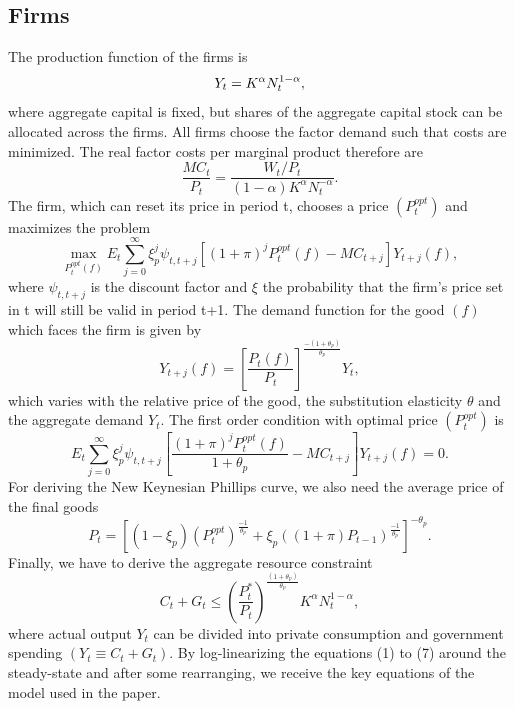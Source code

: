 \documentclass[12pt,a4paper,oneside,titlepage]{article}
\begin{document}
\subsection*{Firms}
The production function of the firms is
\begin{equation}
Y_t = K^\alpha N_t^{1-\alpha},\vspace{-0.3cm} \nonumber
\end{equation}
where aggregate capital is fixed, but shares of the aggregate capital stock can be allocated across the firms. All firms choose the factor demand such that costs are minimized. The real factor costs per marginal product therefore are
\begin{equation}
\frac{MC_t}{P_t} = \frac{W_t/P_t}{\left(1 - \alpha \right) K^\alpha N_t^{-\alpha}}.
\end{equation}
The firm, which can reset its price in period t, chooses a price $\left(P_t^{opt} \right)$ and maximizes the problem
\begin{equation}
\max_{P_t^{opt}\left(f\right)} E_t \sum_{j=0}^\infty \xi_p^j \psi_{t,t+j} \left[ \left(1 + \pi \right)^j P_t^{opt}\left(f\right) - MC_{t+j} \right] Y_{t+j} \left(f\right),\nonumber
\end{equation}
where $\psi_{t,t+j}$ is the discount factor and $\xi$ the probability that the firm's price set in t will still be valid in period t+1. The demand function for the good $\left(f\right)$ which faces the firm is given by
\begin{equation}
Y_{t+j}\left(f\right) = \left[\frac{P_t \left(f\right)}{P_t} \right]^{\frac{-\left(1+\theta_p\right)}{\theta_p}} Y_t \nonumber,
\end{equation}
which varies with the relative price of the good, the substitution elasticity $\theta$ and the aggregate demand $Y_t$. The first order condition with optimal price $\left(P_t^{opt} \right)$ is
\begin{equation}
E_t \sum_{j=0}^\infty \xi_p^j \psi_{t,t+j} \left[ \frac{\left(1 + \pi \right)^j P_t^{opt}\left(f\right)}{1 + \theta_p} - MC_{t+j} \right] Y_{t+j}\left(f\right) = 0.
\end{equation}
For deriving the New Keynesian Phillips curve, we also need the average price of the final goods
\begin{equation}
P_t = \left[\left(1 - \xi_p\right)\left(P_t^{opt}\right)^{\frac{-1}{\theta_p}} + \xi_p \left(\left(1 + \pi\right)P_{t-1}\right)^{\frac{-1}{\theta_p}} \right]^{-\theta_p}.
\end{equation}
Finally, we have to derive the aggregate resource constraint
\begin{equation}
C_t + G_t \leq \left(\frac{P_t^*}{P_t}\right)^{\frac{\left(1+\theta_p\right)}{\theta_p}} K^\alpha N_t^{1-\alpha},
\end{equation}
where actual output $Y_t$ can be divided into private consumption and government spending $\left(Y_t \equiv C_t + G_t \right)$.\newline
By log-linearizing the equations (1) to (7) around the steady-state and after some rearranging, we receive the key equations of the model used in the \citet{Erceg.2014} paper.
\end{document}
